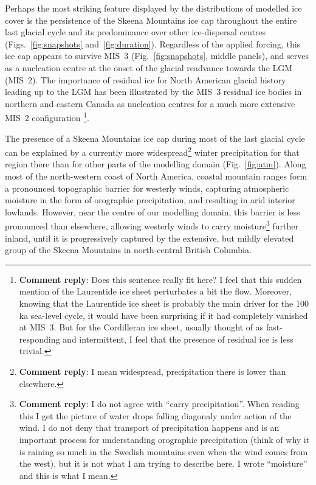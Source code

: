 \documentclass[tc, manuscript]{copernicus}
\newcommand{\renote}[1]{\footnote{\textbf{Comment reply}: #1}}
\begin{document}
Perhaps the most striking feature displayed by the distributions of modelled
ice cover is the persistence of the Skeena Mountains ice cap throughout the
entire last glacial cycle and its predominance over other ice-dispersal centres
(Figs.~\ref{fig:snapshots} and~\ref{fig:duration}). Regardless of the applied
forcing, this ice cap appears to survive MIS~3 (Fig.~\ref{fig:snapshots},
middle panels), and serves as a nucleation centre at the onset of the glacial
readvance towards the LGM (MIS~2). The importance of residual ice for North
American glacial history leading up to the LGM has been illustrated by the
MIS~3 residual ice bodies in northern and eastern Canada as nucleation centres
for a much more extensive MIS~2 configuration \citep{Kleman.etal.2010}\renote{
    Does this sentence really fit here? I feel that this sudden mention of the
    Laurentide ice sheet perturbates a bit the flow. Moreover, knowing that
    the Laurentide ice sheet is probably the main driver for the 100\,ka
    sea-level cycle, it would have been surprising if it had completely
    vanished at MIS~3. But for the Cordilleran ice sheet, usually thought of
    as fast-responding and intermittent, I feel that the presence of residual
    ice is less trivial.}.

The presence of a Skeena Mountains ice cap during most of the last glacial
cycle can be explained by a currently more widespread\renote{
    I mean widespread, precipitation there is lower than elsewhere.}
winter precipitation for that region there than for other parts of the
modelling domain (Fig.~\ref{fig:atm}). Along most of the north-western coast of
North America, coastal mountain ranges form a pronounced topographic barrier
for westerly winds, capturing atmospheric moisture in the form of orographic
precipitation, and resulting in arid interior lowlands. However, near the
centre of our modelling domain, this barrier is less pronounced than elsewhere,
allowing westerly winds to carry moisture\renote{
    I do not agree with ``carry precipitation''. When reading this I get the
    picture of water drops falling diagonaly under action of the wind. I do not
    deny that transport of precipitation happens and
    is an important process for understanding orographic
    precipitation (think of why it is raining so much in the Swedish mountains
    even when the wind comes from the west), but it is not what I am trying to
    describe here. I wrote ``moisture'' and this is what I mean.}
further inland, until it is progressively captured by the extensive, but mildly
elevated group of the Skeena Mountains in north-central British Columbia.
\end{document}
